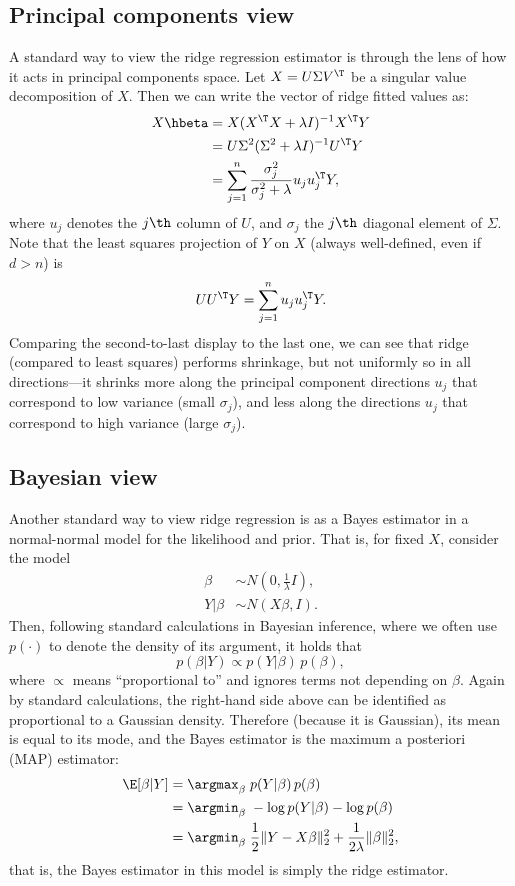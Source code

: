 \documentclass{article}
\begin{document}
\subsection{Principal components view}

A standard way to view the ridge regression estimator is through the lens of how
it acts in principal components space. Let $X = U \Sigma V^\T$ be a singular
value decomposition of $X$. Then we can write the vector of ridge fitted values
as: 
\begin{align*}
X\hbeta &= X (X^\T X + \lambda I)^{-1} X^\T Y \\
&= U \Sigma^2 (\Sigma^2 + \lambda I)^{-1} U^\T Y \\ 
&= \sum_{j=1}^n \frac{\sigma_j^2}{\sigma_j^2+\lambda} u_j u_j^\T Y,  
\end{align*}
where $u_j$ denotes the $j\th$ column of $U$, and $\sigma_j$ the $j\th$ diagonal 
element of $\Sigma$. Note that the least squares projection of $Y$ on $X$
(always well-defined, even if $d > n$) is
\[
U U^\T Y = \sum_{j=1}^n u_j u_j^\T Y.
\]
Comparing the second-to-last display to the last one, we can see that ridge 
(compared to least squares) performs shrinkage, but not uniformly so in all 
directions---it shrinks more along the principal component directions $u_j$ that
correspond to low variance (small $\sigma_j$), and less along the directions
$u_j$ that correspond to high variance (large $\sigma_j$).    

\subsection{Bayesian view}

Another standard way to view ridge regression is as a Bayes estimator in a 
normal-normal model for the likelihood and prior. That is, for fixed $X$,
consider the model 
\begin{equation}
\label{eq:normal_bayes}
\begin{aligned}
\beta &\sim N(0, \frac{1}{\lambda} I), \\
Y | \beta &\sim N(X\beta, I).
\end{aligned}
\end{equation}
Then, following standard calculations in Bayesian inference, where we often use
$p(\cdot)$ to denote the density of its argument, it holds that
\[
p(\beta | Y) \propto p(Y | \beta) \, p(\beta),
\]
where $\propto$ means ``proportional to'' and ignores terms not depending on
$\beta$. Again by standard calculations, the right-hand side above can be
identified as proportional to a Gaussian density. Therefore (because it is
Gaussian), its mean is equal to its mode, and the Bayes estimator is the maximum 
a posteriori (MAP) estimator:
\begin{align}
\nonumber
\E[\beta | Y] &= \argmax_\beta \; p(Y | \beta) \, p(\beta) \\
&= \argmin_\beta \; -\log p(Y | \beta) - \log p(\beta) \\
\label{eq:ridge_bayes}
&= \argmin_\beta \; \frac{1}{2} \|Y - X\beta\|_2^2 + \frac{1}{2\lambda}
  \|\beta\|_2^2,
\end{align}
that is, the Bayes estimator in this model is simply the ridge estimator. 
\end{document}
